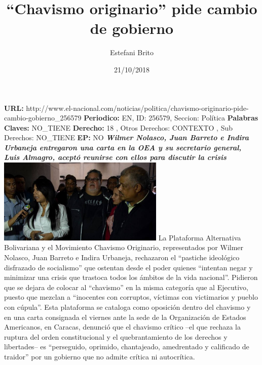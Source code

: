 \documentclass{article}%
\title{\textbf{“Chavismo originario” pide cambio de gobierno}}%
\author{Estefani Brito}%
\date{21/10/2018}%
\begin{document}
%
\normalsize%
\maketitle%
\textbf{URL: }%
http://www.el{-}nacional.com/noticias/politica/chavismo{-}originario{-}pide{-}cambio{-}gobierno\_256579\newline%
%
\textbf{Periodico: }%
EN, %
ID: %
256579, %
Seccion: %
Política\newline%
%
\textbf{Palabras Claves: }%
NO\_TIENE\newline%
%
\textbf{Derecho: }%
18%
, Otros Derechos: %
CONTEXTO%
, Sub Derechos: %
NO\_TIENE%
\newline%
%
\textbf{EP: }%
NO\newline%
\newline%
%
\textbf{\textit{Wilmer Nolasco, Juan Barreto e Indira Urbaneja entregaron una carta en la OEA y su secretario general, Luis Almagro, aceptó reunirse con ellos para discutir la crisis}}%
\newline%
\newline%
%
\includegraphics[width=300px]{141.jpg}%
\newline%
%
La Plataforma Alternativa Bolivariana y el Movimiento Chavismo Originario, representados por Wilmer Nolasco, Juan Barreto e Indira Urbaneja, rechazaron el “pastiche ideológico disfrazado de socialismo” que ostentan desde el poder quienes “intentan negar y minimizar una crisis que trastoca todos los ámbitos de la vida nacional”.%
\newline%
%
Pidieron que se dejara de colocar al “chavismo” en la misma categoría que al Ejecutivo, puesto que mezclan a “inocentes con corruptos, víctimas con victimarios y pueblo con cúpula”.%
\newline%
%
Esta plataforma se cataloga como oposición dentro del chavismo y en una carta consignada el viernes ante la sede de la Organización de Estados Americanos, en Caracas, denunció que el chavismo crítico –el que rechaza la ruptura del orden constitucional y el quebrantamiento de los derechos y libertades– es “perseguido, oprimido, chantajeado, amedrentado y calificado de traidor” por un gobierno que no admite crítica ni autocrítica.%
\end{document}
